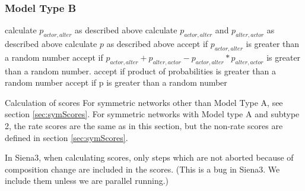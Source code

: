 \documentclass[12pt,a4paper]{article}
\makeatletter
\renewcommand{\=}{\,=\,}
\newcommand{\+}{\,+\,}
\newcommand{\Sn}{{\sf Siena3}}
\renewcommand{\subsection}{\@startsection{subsection}{2}
                {0pt}{0.7\baselineskip}{0.3\baselineskip}
                {\sffamily} }
\makeatother
\begin{document}
\subsubsection{Model Type B}
\label{sec:alterSymB}
\begin{algorithmic}
\STATE calculate $p_{actor, alter}$
as described above
\STATE calculate $p_{actor, alter}$ and $p_{alter, actor}$
as described above
\STATE calculate $p$ as described above
\ENDIF
{}
  \STATE accept if $p_{actor, alter}$ is greater than a random number
  \STATE accept if $p_{actor, alter} + p_{alter, actor} - p_{actor, alter} *
p_{alter,actor}$ is greater than a random number.
  \ELSE
  \STATE accept if product of probabilities is greater than a random number
  \ENDIF
{}
\STATE accept if p is greater than a random number
\ENDIF
\end{algorithmic}
\subsection{Calculation of scores}
\label{sec:scores}
For symmetric networks other than Model Type A, see section
\ref{sec:symScores}. For symmetric networks with Model type A and subtype 2, the
rate scores are the same as in this section, but the non-rate scores are defined
in section \ref{sec:symScores}.

In \Sn, when calculating scores, only steps which are not aborted because of
composition change are included in the scores. (This is a bug in \Sn. We include
them unless we are parallel running.)
\end{document}
